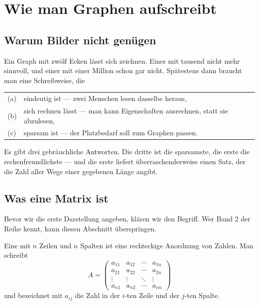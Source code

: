 \chapter{Wie man Graphen aufschreibt}

\section{Warum Bilder nicht genügen}

Ein Graph mit zwölf Ecken lässt sich zeichnen. Einer mit tausend nicht mehr sinnvoll, und einer mit einer Million schon gar nicht. Spätestens dann braucht man eine Schreibweise, die

\begin{center}
\renewcommand{\arraystretch}{1.5}
\begin{tabular}{@{}P{1.0cm}P{7.4cm}@{}}
\toprule
(a) & eindeutig ist --- zwei Menschen lesen dasselbe heraus,\\
(b) & sich rechnen lässt --- man kann Eigenschaften ausrechnen, statt sie abzulesen,\\
(c) & sparsam ist --- der Platzbedarf soll zum Graphen passen.\\
\bottomrule
\end{tabular}
\end{center}

Es gibt drei gebräuchliche Antworten. Die dritte ist die sparsamste, die erste die rechenfreundlichste --- und die erste liefert überraschenderweise einen Satz, der die Zahl aller Wege einer gegebenen Länge angibt.

\section{Was eine Matrix ist}

Bevor wir die erste Darstellung angeben, klären wir den Begriff. Wer Band 2 der Reihe kennt, kann diesen Abschnitt überspringen.

\begin{definition}
Eine  mit $n$ Zeilen und $n$ Spalten ist eine rechteckige Anordnung von Zahlen. Man schreibt
\[ A = \begin{pmatrix}
a_{11} & a_{12} & \cdots & a_{1n} \\
a_{21} & a_{22} & \cdots & a_{2n} \\
\vdots & \vdots & \ddots & \vdots \\
a_{n1} & a_{n2} & \cdots & a_{nn}
\end{pmatrix} \]
und bezeichnet mit $a_{ij}$ die Zahl in der $i$-ten Zeile und der $j$-ten Spalte.
\end{definition}

